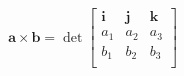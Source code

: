 \documentclass[12pt]{article}
\begin{document}
$$
{\mathbf  {a}}\times {\mathbf  {b}}=\det {\begin{bmatrix}{\mathbf  {i}}&{\mathbf  {j}}&{\mathbf  {k}}\\a_{1}&a_{2}&a_{3}\\b_{1}&b_{2}&b_{3}\\\end{bmatrix}}
$$
\end{document}
